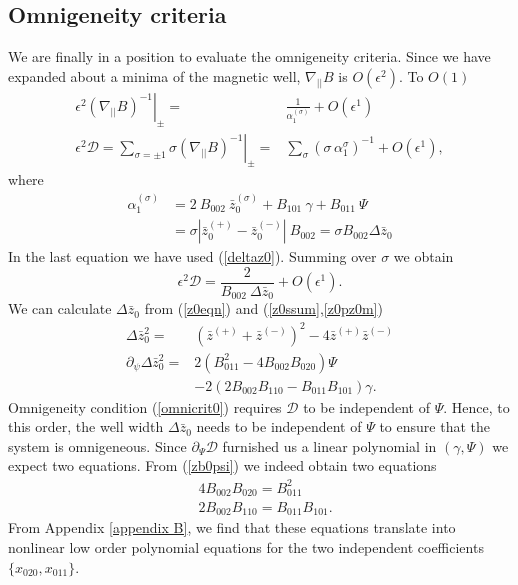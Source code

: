 \documentclass[aip,pop,reprint]{revtex4-1}
\newcommand*\at[2]{\left.#1\right|_{#2}}
\newcommand*{\cD}{\mathcal{D}}
\newcommand*{\ep}{\epsilon}
\newcommand*{\dpl}{\nabla_{||}}
\newcommand*{\zb}{\bar{z}}
\newcommand*{\zbs}{\zb^{(\sigma)}}
\newcommand*{\zbp}{\zb^{(+)}}
\newcommand*{\zbm}{\zb^{(-)}}
\begin{document}
\subsection{Omnigeneity criteria}
\label{subsec:omnicrit}
We are finally in a position to evaluate the omnigeneity criteria. Since we have expanded about a minima of the magnetic well, $\dpl B$ is $O(\epsilon^2)$. To $O(1)$
\begin{subequations}
\begin{align}
\ep^2\at{(\dpl B)^{-1}}{\pm}= &\frac{1}{\alpha^{(\sigma)}_1} +O(\epsilon^{1})\\
\ep^2\cD=\sum_{\sigma=\pm 1}\sigma\at{(\dpl B)^{-1}}{\pm}=& \sum_\sigma (\sigma\,\alpha^{\sigma}_1)^{-1} +O(\epsilon^{1}), \label{cDm2}
\end{align}
\end{subequations}
where
\begin{align}
\alpha_1^{(\sigma)}&= 2\:B_{002}\:\zbs_0 +B_{101}\:\gamma +B_{011}\:\Psi\\
&= \sigma |\zbp_0-\zbm_0|\:B_{002} =\sigma B_{002} \Delta \zb_0\nonumber
\end{align}
In the last equation we have used (\ref{deltaz0}). Summing over $\sigma$ we obtain
$$\ep^2\cD = \frac{2}{B_{002} \: \Delta \zb_0} + O(\epsilon^{1}).$$
We can calculate $\Delta\zb_0$ from (\ref{z0eqn}) and (\ref{z0ssum},\ref{z0pz0m})
\begin{align}
    \Delta\zb_0^2= &(\zbp+\zbm)^2-4\zbp\zbm \nonumber\\
    \partial_\psi \Delta\zb_0^2= &2\left(B_{011}^2 - 4 B_{002}B_{020} \right)\Psi \label{zb0psi}
    \\&-2\left(2 B_{002}B_{110}-B_{011}B_{101} \right)\gamma. \nonumber
\end{align}
Omnigeneity condition (\ref{omnicrit0}) requires $\cD$ to be independent of $\Psi$. Hence, to this order, the well width $\Delta \zb_0$ needs to be independent of $\Psi$ to ensure that the system is omnigeneous.
Since $\partial_\Psi \cD$ furnished us a linear polynomial in $(\gamma,\Psi)$ we expect two equations. From (\ref{zb0psi}) we indeed obtain two equations
\begin{align}
&4 B_{002}B_{020}=B_{011}^2\nonumber \\
&2 B_{002}B_{110}=B_{011}B_{101}.
\label{omniB1}
\end{align}
From Appendix \ref{appendix B}, we find that these equations translate into nonlinear low order polynomial equations for the two independent coefficients $\{x_{020},x_{011}\}$. 
\end{document}
